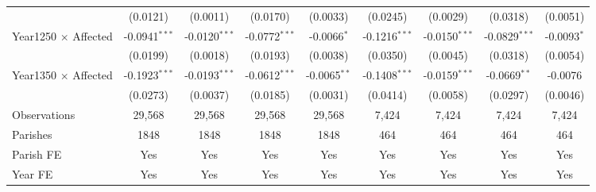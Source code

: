 \documentclass[11pt]{article}
\begin{document}
\begin{landscape}
\begin{table}
\begin{tabular}{lcccccccc}
                                                    & (0.0121)        & (0.0011)        & (0.0170)              & (0.0033)               & (0.0245)               & (0.0029)               & (0.0318)        & (0.0051)\\   
   Year1250 $\times$ Affected                       & -0.0941$^{***}$ & -0.0120$^{***}$ & -0.0772$^{***}$       & -0.0066$^{*}$          & -0.1216$^{***}$        & -0.0150$^{***}$        & -0.0829$^{***}$ & -0.0093$^{*}$\\   
                                                    & (0.0199)        & (0.0018)        & (0.0193)              & (0.0038)               & (0.0350)               & (0.0045)               & (0.0318)        & (0.0054)\\   
   Year1350 $\times$ Affected                       & -0.1923$^{***}$ & -0.0193$^{***}$ & -0.0612$^{***}$       & -0.0065$^{**}$         & -0.1408$^{***}$        & -0.0159$^{***}$        & -0.0669$^{**}$  & -0.0076\\   
                                                    & (0.0273)        & (0.0037)        & (0.0185)              & (0.0031)               & (0.0414)               & (0.0058)               & (0.0297)        & (0.0046)\\   
   \midrule
   Observations                                     & 29,568          & 29,568          & 29,568                & 29,568                 & 7,424                  & 7,424                  & 7,424          & 7,424\\  
   Parishes                                         & 1848            & 1848            & 1848                  & 1848                   & 464                    & 464                    & 464            & 464\\
   \midrule 
   Parish FE                                        & Yes             & Yes             & Yes                   & Yes                    & Yes                    & Yes                    & Yes            & Yes\\  
   Year FE                                          & Yes             & Yes             & Yes                   & Yes                    & Yes                    & Yes                    & Yes            & Yes\\
   \midrule \midrule
\end{tabular}
\parbox{1\textwidth}{
}
\end{table}
\end{landscape}
\end{document}
